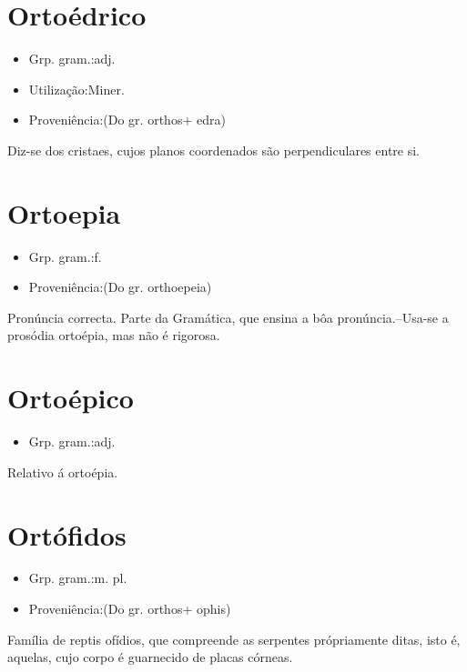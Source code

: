 \section{Ortoédrico}
\begin{itemize}
\item {Grp. gram.:adj.}
\end{itemize}
\begin{itemize}
\item {Utilização:Miner.}
\end{itemize}
\begin{itemize}
\item {Proveniência:(Do gr. \textunderscore orthos\textunderscore  + \textunderscore edra\textunderscore )}
\end{itemize}
Diz-se dos cristaes, cujos planos coordenados são perpendiculares entre si.
\section{Ortoepia}
\begin{itemize}
\item {Grp. gram.:f.}
\end{itemize}
\begin{itemize}
\item {Proveniência:(Do gr. \textunderscore orthoepeia\textunderscore )}
\end{itemize}
Pronúncia correcta.
Parte da Gramática, que ensina a bôa pronúncia.--Usa-se a prosódia \textunderscore ortoépia\textunderscore , mas não é rigorosa.
\section{Ortoépico}
\begin{itemize}
\item {Grp. gram.:adj.}
\end{itemize}
Relativo á ortoépia.
\section{Ortófidos}
\begin{itemize}
\item {Grp. gram.:m. pl.}
\end{itemize}
\begin{itemize}
\item {Proveniência:(Do gr. \textunderscore orthos\textunderscore  + \textunderscore ophis\textunderscore )}
\end{itemize}
Família de reptis ofídios, que compreende as serpentes própriamente ditas, isto é, aquelas, cujo corpo é guarnecido de placas córneas.
